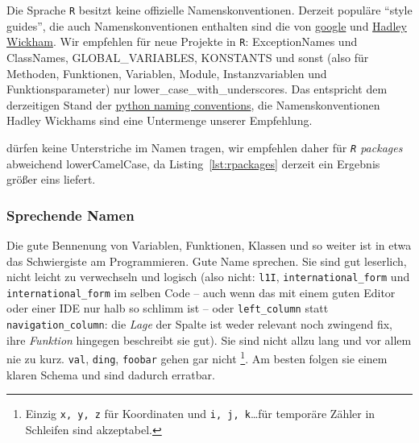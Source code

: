 \documentclass[twoside]{scrartcl}
\providecommand{\R}{\texttt{R}}
\providecommand{\code}[1]{\texttt{#1}}
\begin{document}
Die Sprache \R{} besitzt keine offizielle Namenskonventionen. Derzeit
popul\"a{}re "`style guides"', die auch Namenskonventionen enthalten sind die
von
\href{https://google-styleguide.googlecode.com/svn/trunk/Rguide.xml}{google} und
\href{http://adv-r.had.co.nz/Style.html}{Hadley Wickham}.
Wir empfehlen f\"u{}r neue Projekte in \R{}: 
ExceptionNames und ClassNames, GLOBAL\_VARIABLES, KONSTANTS und sonst (also
f\"u{}r Methoden, Funktionen, Variablen, Module, Instanzvariablen und
Funktionsparameter) nur lower\_case\_with\_underscores.
Das entspricht dem derzeitigen Stand der
\href{http://legacy.python.org/dev/peps/pep-0008/#naming-conventions}{python
  naming conventions}, die Namenskonventionen Hadley Wickhams sind eine
  Untermenge unserer Empfehlung.

 d\"urfen keine Unterstriche im Namen tragen, wir
empfehlen daher f\"u{}r \emph{\R{} packages} abweichend lowerCamelCase, 
da Listing~\ref{lst:rpackages} derzeit ein Ergebnis gr\"o{}\ss{}er eins 
liefert.


\subsubsection{Sprechende Namen}
Die gute Bennenung von Variablen, Funktionen, Klassen und so weiter ist in etwa
das Schwiergiste am Programmieren. Gute Name sprechen. Sie sind gut leserlich,
nicht leicht zu verwechseln und logisch (also nicht: \code{l1I},
\code{international\_form} und \code{international\_form} im selben Code
-- auch wenn das mit einem guten Editor oder einer IDE nur halb so schlimm ist
--
oder \code{left\_column} statt \code{navigation\_column}: die \emph{Lage} der
Spalte ist weder relevant noch zwingend fix, ihre \emph{Funktion} hingegen
beschreibt sie gut).
Sie sind nicht allzu lang und vor allem nie zu kurz.
\code{val}, \code{ding}, \code{foobar} gehen gar nicht%
\footnote{Einzig \code{x, y, z} f\"ur Koordinaten
  und \code{i, j, k}\ldots f\"ur tempor\"a{}re Z\"a{}hler in Schleifen sind
  akzeptabel.}.
Am besten folgen sie einem klaren Schema und sind dadurch erratbar.
\end{document}
